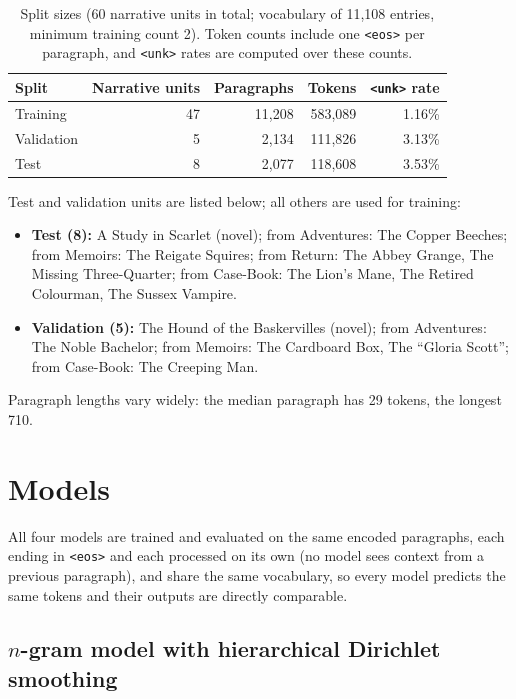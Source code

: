 \documentclass[11pt]{article}
\begin{document}
\begin{table}[h]
\centering
\begin{tabular}{lrrrr}
\toprule
Split & Narrative units & Paragraphs & Tokens & \texttt{<unk>} rate \\
\midrule
Training & 47 & 11{,}208 & 583{,}089 & 1.16\% \\
Validation & 5 & 2{,}134 & 111{,}826 & 3.13\% \\
Test & 8 & 2{,}077 & 118{,}608 & 3.53\% \\
\bottomrule
\end{tabular}
\caption{Split sizes (60 narrative units in total; vocabulary of 11{,}108
entries, minimum training count 2). Token counts include one
\texttt{<eos>} per paragraph, and \texttt{<unk>} rates are computed over
these counts.}
\label{tab:splits}
\end{table}

Test and validation units are listed below; all others are used for training:
\begin{itemize}
    \item \textbf{Test (8):} {A Study in Scarlet} (novel); from
    {Adventures}: The Copper Beeches; from {Memoirs}: The Reigate
    Squires; from {Return}: The Abbey Grange, The Missing
    Three-Quarter; from {Case-Book}: The Lion's Mane, The Retired
    Colourman, The Sussex Vampire.
    \item \textbf{Validation (5):} {The Hound of the Baskervilles}
    (novel); from {Adventures}: The Noble Bachelor; from
    {Memoirs}: The Cardboard Box, The ``Gloria Scott''; from
    {Case-Book}: The Creeping Man.
\end{itemize}

Paragraph lengths vary widely: the median paragraph has 29 tokens, the longest 710.

\section{Models}

All four models are trained and evaluated on the same encoded
paragraphs, each ending in \texttt{<eos>} and each processed on its own
(no model sees context from a previous paragraph), and share the same
vocabulary, so every model predicts the same tokens and their outputs are directly comparable.

\subsection{$n$-gram model with hierarchical Dirichlet smoothing}
\end{document}
